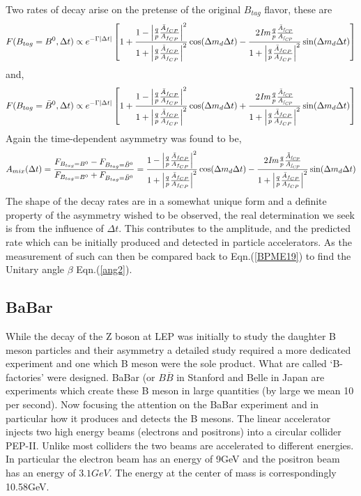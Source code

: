 Two rates of decay arise on the pretense of the original $B_{tag}$ flavor, these are
\begin{equation}\label{BPME17}
F(B_{tag}=B^{0},\Delta t) \propto
 e^{-\Gamma |\Delta t|}
\left[1+\frac{1-\left|\frac{q}{p}\frac{\bar{A}_{f_{CP}}}{A_{f_{CP}}}
\right|^{2}}{1+\left|\frac{q}{p}\frac{\bar{A}_{f_{CP}}}{A_{f_{CP}}}\right|^{2}}\cos(\Delta m_{d}\Delta t) - 
\frac{2\it{I}m\frac{q}{p}\frac{\bar{A}_{f_{CP}}}{A_{f_{CP}}}}
{1+\left|\frac{q}{p}\frac{\bar{A}_{f_{CP}}}{A_{f_{CP}}}
\right|^{2}}
\sin(\Delta m_{d} \Delta t)\right]
\end{equation}
and,
\begin{equation}\label{BPME18}
F(B_{tag}=\bar{B}^{0},\Delta t) \propto
 e^{-\Gamma |\Delta t|}
\left[1+\frac{1-\left|\frac{q}{p}\frac{\bar{A}_{f_{CP}}}{A_{f_{CP}}}
\right|^{2}}{1+\left|\frac{q}{p}\frac{\bar{A}_{f_{CP}}}{A_{f_{CP}}}\right|^{2}}\cos(\Delta m_{d}\Delta t) + 
\frac{2\it{I}m\frac{q}{p}\frac{\bar{A}_{f_{CP}}}{A_{f_{CP}}}}
{1+\left|\frac{q}{p}\frac{\bar{A}_{f_{CP}}}{A_{f_{CP}}}
\right|^{2}}
\sin(\Delta m_{d} \Delta t)\right]
\end{equation}
Again the time-dependent asymmetry was found \cite{B6} to be,
\begin{equation}\label{BPME19}
A_{mix}(\Delta t) = \frac{F_{B_{tag}=B^0}-F_{B_{tag}=\bar{B}^0}}{F_{B_{tag}=B^0}+F_{B_{tag}=\bar{B}^0}} = \frac{1-\left|\frac{q}{p}\frac{\bar{A}_{f_{CP}}}{A_{f_{CP}}}
\right|^{2}}{1+\left|\frac{q}{p}\frac{\bar{A}_{f_{CP}}}{A_{f_{CP}}}\right|^{2}}\cos(\Delta m_{d}\Delta t) - 
\frac{2\it{I}m\frac{q}{p}\frac{\bar{A}_{f_{CP}}}{A_{f_{CP}}}}
{1+\left|\frac{q}{p}\frac{\bar{A}_{f_{CP}}}{A_{f_{CP}}}
\right|^{2}}
\sin(\Delta m_{d} \Delta t)
\end{equation}
The shape of the decay rates are in a somewhat unique form and a definite property of the asymmetry wished to be observed, the real determination we seek is from the influence of $\Delta t$. This contributes to the amplitude, and the predicted rate which can be initially produced and detected in particle accelerators. As the measurement of such can then be compared back to Eqn.(\ref{BPME19}) to find the Unitary angle $\beta$ Eqn.(\ref{ang2}).


\subsection{BaBar}
While the decay of the Z boson at LEP was initially to study the daughter B meson particles and their asymmetry a detailed study required a more dedicated experiment and one which B meson were the sole product. What are called `B-factories' were designed. BaBar (or $B\overline{B}$ in Stanford and Belle in Japan are experiments which create these B meson in large quantities (by large we mean 10 per second). Now focusing the attention on the BaBar experiment and in particular how it produces and detects the B mesons. The linear accelerator injects two high energy beams (electrons and positrons) into a circular collider PEP-II. Unlike most colliders the two beams are accelerated to different energies. In particular the electron beam has an energy of 9GeV and the positron beam has an energy of $3.1GeV$. The energy at the center of mass is correspondingly 10.58GeV.

